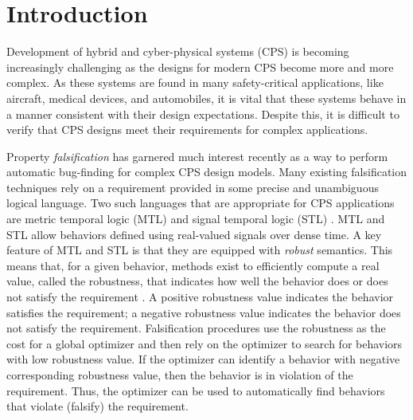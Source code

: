 \section{Introduction} \label{sec:introduction}

Development of hybrid and cyber-physical systems (CPS) is becoming
increasingly challenging as the designs for modern CPS become more and
more complex.  As these systems are found in many safety-critical
applications, like aircraft, medical devices, and automobiles, it is
vital that these systems behave in a manner consistent with their
design expectations. Despite this, it is difficult to verify that CPS
designs meet their requirements for complex applications.


Property \emph{falsification} has garnered much interest recently as a
way to perform automatic bug-finding for complex CPS design
models. Many existing falsification techniques rely on a requirement
provided in some precise and unambiguous logical language. Two such
languages that are appropriate for CPS applications are metric
temporal logic (MTL) and signal temporal logic (STL)
\cite{Koymans1990,MalerN04}. MTL and STL allow behaviors defined
using real-valued signals over dense time. A key feature of MTL and
STL is that they are equipped with \emph{robust} semantics. This means
that, for a given behavior, methods exist to efficiently compute a
real value, called the robustness, that indicates how well the
behavior does or does not satisfy the requirement
\cite{FainekosP06fates,DonzeM10}. A positive robustness value
indicates the behavior satisfies the requirement; a negative
robustness value indicates the behavior does not satisfy the
requirement.  Falsification procedures use the robustness as the cost
for a global optimizer and then rely on the optimizer to search for
behaviors with low robustness value. If the optimizer can identify a
behavior with negative corresponding robustness value, then the
behavior is in violation of the requirement. Thus, the optimizer can
be used to automatically find behaviors that violate (falsify) the
requirement.

